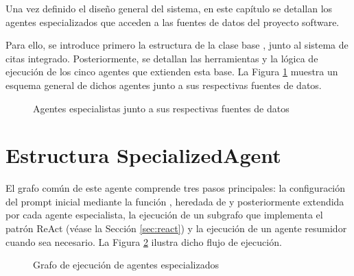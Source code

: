 Una vez definido el diseño general del sistema, en este capítulo se detallan los agentes especializados que acceden a las fuentes de datos del proyecto software.

Para ello, se introduce primero la estructura de la clase base , junto al sistema de citas integrado. Posteriormente, se detallan las herramientas y la lógica de ejecución de los cinco agentes que extienden esta base. La Figura \ref{fig:esquema_agentes_full} muestra un esquema general de dichos agentes junto a sus respectivas fuentes de datos.

\begin{figure}[h]
  \centering
  \caption{Agentes especialistas junto a sus respectivas fuentes de datos}
  \label{fig:esquema_agentes_full}
\end{figure}

\section{Estructura SpecializedAgent}
El grafo común de este agente comprende tres pasos principales: la configuración del prompt inicial mediante la función , heredada de  y posteriormente extendida por cada agente especialista, la ejecución de un subgrafo que implementa el patrón ReAct (véase la Sección \ref{sec:react}) y la ejecución de un agente resumidor cuando sea necesario. La Figura \ref{fig:specialized} ilustra dicho flujo de ejecución.

\begin{figure}[h]
  \centering
  \caption{Grafo de ejecución de agentes especializados}
  \label{fig:specialized}
\end{figure}

